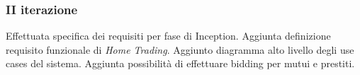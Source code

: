 \documentclass[10pt]{softeng} %
\begin{document}
\subsubsection{II iterazione}

Effettuata specifica dei requisiti per fase di Inception.
Aggiunta definizione requisito funzionale di \emph{Home Trading}.
Aggiunto diagramma alto livello degli use cases del sistema.
Aggiunta possibilit\`a di effettuare bidding per mutui e prestiti.

%
%
%
%
%
%
%
%
%
%
\end{document}
